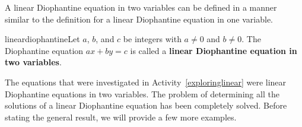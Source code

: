 A linear Diophantine equation in two variables can be defined in a manner similar to the definition for a linear Diophantine equation in one variable.

\begin{defbox}{lineardiophantine}{Let $a$, $b$, and $c$ be integers with $a \ne 0$ and 
$b \ne 0$.  The Diophantine equation $ax + by = c$ is called a \textbf{linear Diophantine equation in two variables}.}
%
%
\end{defbox}

The equations that were investigated in \typeu Activity~\ref*{exploringlinear} were linear Diophantine equations in two variables.  The problem of determining all the solutions of a linear Diophantine equation has been completely solved.  Before stating the general result, we will provide a few more examples.
%

